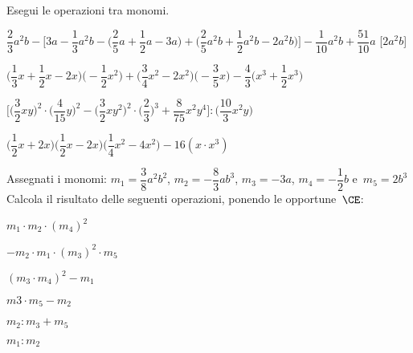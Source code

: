 \begin{esercizio}[\Ast]
 \label{ese:9.36}
Esegui le operazioni tra monomi.

\begin{enumeratea}
 \item 
\(\dfrac{2}{3}a^{2}b-\bigg[3a-\dfrac{1}{3}a^{2}b-\bigg(\dfrac{2}{5}a+\dfrac{1}{2}
a-3a\bigg)+\bigg(\dfrac{2}{5}a^{2}b+\dfrac{1}{2}a^{2}b-2a^{2}b\bigg)\bigg]%
 -\dfrac{1}{10}a^{2}b+\dfrac{51}{10}a\)
  \hfill[\(2a^{2}b\)]
 \item 
\(\bigg(\dfrac{1}{3}x+\dfrac{1}{2}x-2x\bigg)\bigg(-{\dfrac{1}{2}x^{2}}
\bigg)+\bigg(\dfrac{3}{4}x^{2}-2x^{2}\bigg)\bigg(-{\dfrac{3}{5}x}\bigg)%
 -\dfrac{4}{3}\bigg(x^{3}+\dfrac{1}{2}x^{3}\bigg)\)
  \hfill{}%
%  
 \item 
\(\bigg[\bigg(\dfrac{3}{2}xy\bigg)^{2}\cdot(\dfrac{4}{15}y\bigg)^{2}-\bigg(\dfrac
{3}{2}xy^{2}\bigg)^{2}\cdot\bigg(\dfrac{2}{3}\bigg)^{3}%
 +\dfrac{8}{75}x^{2}y^{4}\bigg]:\bigg(\dfrac{10}{3}x^{2}y\bigg)\)
  \hfill{}
 \item 
\(\bigg(\dfrac{1}{2}x+2x\bigg)\bigg(\dfrac{1}{2}x-2x\bigg)\bigg(\dfrac{1}{4}x^{2}
-4x^{2}\bigg)-16\left(x \cdot x^{3}\right)\)
  \hfill{}
\end{enumeratea}
\end{esercizio}


\begin{esercizio}
 \label{ese:9.37}
Assegnati i monomi:
\(m_{1}=\dfrac{3}{8}a^{2}b^{2}\), \(m_{2}=-{\dfrac{8}{3}}ab^{3}\), \(m_{3}=-3a\), 
\(m_{4}=-{\dfrac{1}{2}}b\) e~\(m_{5}=2b^{3}\)
Calcola il risultato delle seguenti operazioni, ponendo le opportune~\(\CE\):
\begin{multicols}{3}
\begin{enumeratea}
 \item \(m_{1}\cdot m_{2}\cdot (m_{4})^{2}\)
 \item \(-m_{2}\cdot m_{1}\cdot (m_{3})^{2}\cdot m_{5}\)
 \item \((m_{3}\cdot m_{4})^{2}-m_{1}\)
 \item \(m3\cdot m_{5}-m_{2}\)
 \item \(m_{2}:m_{3}+m_{5}\)
 \item \(m_{1}:m_{2}\)
\end{enumeratea}
\end{multicols}
\end{esercizio}


